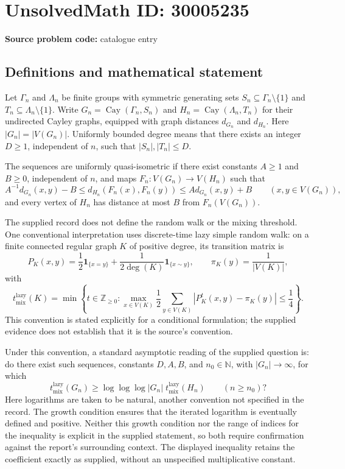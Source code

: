 \documentclass[11pt]{article}
\newcommand{\N}{\mathbb{N}}
\newcommand{\Z}{\mathbb{Z}}
\begin{document}
\section*{UnsolvedMath ID: 30005235}
\textbf{Source problem code:} catalogue entry
\subsection{Definitions and mathematical statement}
Let \(\Gamma_n\) and \(\Lambda_n\) be finite groups with symmetric generating sets \(S_n\subseteq\Gamma_n\setminus\{1\}\) and \(T_n\subseteq\Lambda_n\setminus\{1\}\). Write \(G_n=\operatorname{Cay}(\Gamma_n,S_n)\) and \(H_n=\operatorname{Cay}(\Lambda_n,T_n)\) for their undirected Cayley graphs, equipped with graph distances \(d_{G_n}\) and \(d_{H_n}\). Here \(|G_n|=|V(G_n)|\). Uniformly bounded degree means that there exists an integer \(D\geq1\), independent of \(n\), such that \(|S_n|,|T_n|\leq D\).

The sequences are uniformly quasi-isometric if there exist constants \(A\geq1\) and \(B\geq0\), independent of \(n\), and maps \(F_n:V(G_n)\to V(H_n)\) such that
\[
 A^{-1}d_{G_n}(x,y)-B\leq d_{H_n}(F_n(x),F_n(y))\leq A d_{G_n}(x,y)+B
 \qquad(x,y\in V(G_n)),
\]
and every vertex of \(H_n\) has distance at most \(B\) from \(F_n(V(G_n))\).

The supplied record does not define the random walk or the mixing threshold. One conventional interpretation uses discrete-time lazy simple random walk: on a finite connected regular graph \(K\) of positive degree, its transition matrix is
\[
 P_K(x,y)=\frac12\mathbf{1}_{\{x=y\}}+\frac{1}{2\deg(K)}\mathbf{1}_{\{x\sim y\}},
 \qquad \pi_K(y)=\frac1{|V(K)|},
\]
with
\[
 t_{\mathrm{mix}}^{\mathrm{lazy}}(K)=\min\left\{t\in\Z_{\geq0}:\max_{x\in V(K)}\frac12\sum_{y\in V(K)}\left|P_K^t(x,y)-\pi_K(y)\right|\leq\frac14\right\}.
\]
This convention is stated explicitly for a conditional formulation; the supplied evidence does not establish that it is the source's convention.

Under this convention, a standard asymptotic reading of the supplied question is: do there exist such sequences, constants \(D,A,B\), and \(n_0\in\N\), with \(|G_n|\to\infty\), for which
\[
 t_{\mathrm{mix}}^{\mathrm{lazy}}(G_n)\geq\log\log\log|G_n|\;t_{\mathrm{mix}}^{\mathrm{lazy}}(H_n)
 \qquad(n\geq n_0)?
\]
Here logarithms are taken to be natural, another convention not specified in the record. The growth condition ensures that the iterated logarithm is eventually defined and positive. Neither this growth condition nor the range of indices for the inequality is explicit in the supplied statement, so both require confirmation against the report's surrounding context. The displayed inequality retains the coefficient exactly as supplied, without an unspecified multiplicative constant.
\end{document}
